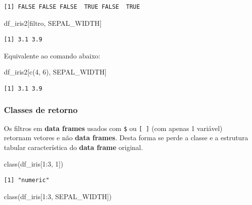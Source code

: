 \documentclass[
  letterpaper,
  DIV=11,
  numbers=noendperiod]{scrreprt}
\newenvironment{Shaded}{\begin{snugshade}}{\end{snugshade}}
\newcommand{\DecValTok}[1]{\textcolor[rgb]{0.68,0.00,0.00}{#1}}
\newcommand{\FunctionTok}[1]{\textcolor[rgb]{0.28,0.35,0.67}{#1}}
\newcommand{\NormalTok}[1]{\textcolor[rgb]{0.00,0.23,0.31}{#1}}
\newcommand{\SpecialCharTok}[1]{\textcolor[rgb]{0.37,0.37,0.37}{#1}}
\newcommand{\StringTok}[1]{\textcolor[rgb]{0.13,0.47,0.30}{#1}}
\begin{document}
\begin{verbatim}
[1] FALSE FALSE FALSE  TRUE FALSE  TRUE
\end{verbatim}

\begin{Shaded}
\begin{Highlighting}[]
\NormalTok{df\_iris2[filtro, }\StringTok{\textquotesingle{}SEPAL\_WIDTH\textquotesingle{}}\NormalTok{]}
\end{Highlighting}
\end{Shaded}

\begin{verbatim}
[1] 3.1 3.9
\end{verbatim}

Equivalente ao comando abaixo:

\begin{Shaded}
\begin{Highlighting}[]
\NormalTok{df\_iris2[}\FunctionTok{c}\NormalTok{(}\DecValTok{4}\NormalTok{, }\DecValTok{6}\NormalTok{), }\StringTok{\textquotesingle{}SEPAL\_WIDTH\textquotesingle{}}\NormalTok{]}
\end{Highlighting}
\end{Shaded}

\begin{verbatim}
[1] 3.1 3.9
\end{verbatim}

\hypertarget{classes-de-retorno}{%
\subsubsection{Classes de retorno}\label{classes-de-retorno}}

Os filtros em \textbf{data frames} usados com \texttt{\$} ou
\texttt{{[}\ {]}} (com apenas 1 variável) retornam vetores e não
\textbf{data frames}. Desta forma se perde a classe e a estrutura
tabular característica do \textbf{data frame} original.

\begin{Shaded}
\begin{Highlighting}[]
\FunctionTok{class}\NormalTok{(df\_iris[}\DecValTok{1}\SpecialCharTok{:}\DecValTok{3}\NormalTok{, }\DecValTok{1}\NormalTok{])}
\end{Highlighting}
\end{Shaded}

\begin{verbatim}
[1] "numeric"
\end{verbatim}

\begin{Shaded}
\begin{Highlighting}[]
\FunctionTok{class}\NormalTok{(df\_iris[}\DecValTok{1}\SpecialCharTok{:}\DecValTok{3}\NormalTok{, }\StringTok{\textquotesingle{}SEPAL\_WIDTH\textquotesingle{}}\NormalTok{])}
\end{Highlighting}
\end{Shaded}
\end{document}
